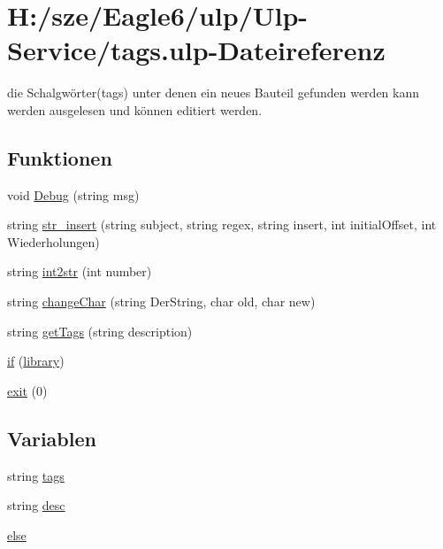\hypertarget{tags_8ulp}{}\section{H\+:/sze/\+Eagle6/ulp/\+Ulp-\/\+Service/tags.ulp-\/\+Dateireferenz}
\label{tags_8ulp}


die Schalgwörter(tags) unter denen ein neues Bauteil gefunden werden kann werden ausgelesen und können editiert werden.  


\subsection*{Funktionen}
\begin{DoxyCompactItemize}
\item 
void \hyperlink{tags_8ulp_ac910cb5042d04372ec6085fe3b09fc4e}{Debug} (string msg)
\item 
string \hyperlink{tags_8ulp_adce6b0a8b9f5f971990074ecb175d04b}{str\+\_\+insert} (string subject, string regex, string insert, int initial\+Offset, int Wiederholungen)
\item 
string \hyperlink{tags_8ulp_aabffd2ab08d259550d4750cfa9c249dc}{int2str} (int number)
\item 
string \hyperlink{tags_8ulp_a5355e56060fc9fff0501f961593df5eb}{change\+Char} (string Der\+String, char old, char new)
\item 
string \hyperlink{tags_8ulp_abc5896fb4a4496a839abccbe21cd1a1d}{get\+Tags} (string description)
\item 
\hyperlink{tags_8ulp_af88a82e52b69cec40b10d164bc6dc746}{if} (\hyperlink{uebersicht_8ulp_a825a5a33f9ea1598f17dac249716ae7e}{library})
\item 
\hyperlink{tags_8ulp_adf5c804dfce7a70e36dda02995fad481}{exit} (0)
\end{DoxyCompactItemize}
\subsection*{Variablen}
\begin{DoxyCompactItemize}
\item 
string \hyperlink{tags_8ulp_abdb764edc6b6729ff73d7c926d6ae6b4}{tags}
\item 
string \hyperlink{tags_8ulp_acc6fde76f2c440ef4a9f7dc3765038b5}{desc}
\item 
\hyperlink{tags_8ulp_a0544c3fe466e421738dae463968b70ba}{else}
\end{DoxyCompactItemize}


